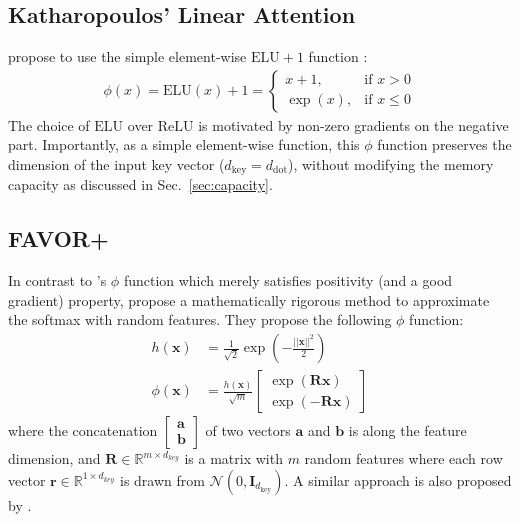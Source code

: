 \documentclass{article}
\def\va{{\bm{a}}}
\def\vb{{\bm{b}}}
\def\vr{{\bm{r}}}
\def\vx{{\bm{x}}}
\def\mR{{\bm{R}}}
\newcommand{\ReLU}{\mathrm{ReLU}}
\newcommand{\ELU}{\mathrm{ELU}}
\theoremstyle{definition}
\begin{document}
\subsection{Katharopoulos' Linear Attention}
\label{sec:katharopoulos}
\citet{katharopoulos2020transformers} propose to use the simple element-wise $\ELU + 1$ function \citep{clevert2015fast}:
\begin{align}
    \phi(x) = \ELU(x) + 1= 
    \begin{cases}
        x+1,& \text{if } x > 0\\
        \exp(x), & \text{if } x \leq 0
    \end{cases}
\end{align}
The choice of $\ELU$ over $\ReLU$ is motivated by non-zero gradients on the negative part.
Importantly, as a simple element-wise function,
this $\phi$ function preserves the dimension of the input key vector ($d_\text{key}=d_\text{dot}$),
without modifying the memory capacity
as discussed in Sec.~\ref{sec:capacity}.

\subsection{FAVOR+}
\label{sec:performer}
In contrast to \citet{katharopoulos2020transformers}'s $\phi$ function 
which merely satisfies positivity (and a good gradient) property,
\citet{choromanski2020rethinking} propose a mathematically rigorous method
to approximate the softmax with random features.
They propose the following $\phi$ function:
\begin{align}
    h(\vx) &= \frac{1}{\sqrt{2}} \exp(-\frac{||\vx||^2}{2}) \\
    \phi(\vx) &= \frac{h(\vx)}{\sqrt{m}}
    \begin{bmatrix}\exp(\mR \vx) \\ \exp(-\mR \vx) \end{bmatrix} \label{eq:performer}
\end{align} 
where the concatenation $\begin{bmatrix}\va \\ \vb \end{bmatrix}$ of two vectors $\va$ and $\vb$ is along the feature dimension, and $\mR \in \mathbb{R}^{m \times d_\textit{key}}$ is a matrix with $m$ random features where each row vector $\vr \in \mathbb{R}^{1 \times d_\textit{key}}$ is drawn from $\mathcal{N}(0,\mathbf{I}_{d_\text{key}})$.
A similar approach is also proposed by \citet{peng2021random}.
\end{document}
